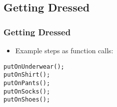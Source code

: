 \subsection{Getting Dressed}
\begin{frame}[fragile]
\frametitle{Getting Dressed}
\begin{itemize}
    \item Example steps as function calls:
\end{itemize}
\begin{verbatim}
putOnUnderwear();
putOnShirt();
putOnPants();
putOnSocks();
putOnShoes();
\end{verbatim}
\end{frame}
